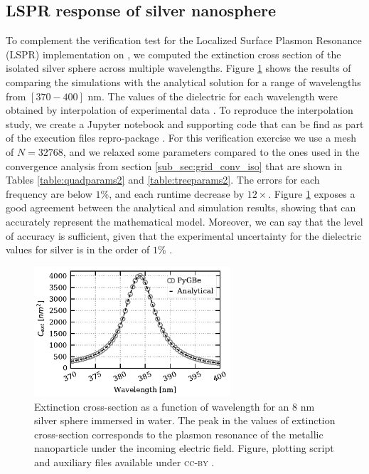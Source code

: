 \subsection{LSPR response of silver nanosphere}\label{sub_sec:lspr_silver_np}

To complement the verification test for the Localized Surface Plasmon Resonance (LSPR) implementation
on \pygbe, we computed the extinction cross section of the isolated silver sphere across multiple 
wavelengths. Figure \ref{fig:verif_sph} shows the results of comparing the simulations with the
analytical solution for a range of wavelengths from $[370-400]$ nm. The values of the dielectric 
for each wavelength were obtained by interpolation of experimental data 
\cite{HaleQuerry1972, JohnsonChristy1972}. To reproduce the interpolation study, we create
a Jupyter notebook and supporting code that can be find as part of the execution files
repro-package \cite{ClementiETal2018b}.
For this verification exercise we use a mesh of $N=32768$, and we relaxed some parameters 
compared to the ones used in the convergence analysis from section \ref{sub_sec:grid_conv_iso} 
that are shown in Tables \ref{table:quadparams2} and \ref{table:treeparams2}. The errors for each 
frequency are below $1\%$, and each runtime decrease by $12\times$.
Figure \ref{fig:verif_sph} exposes a good agreement between the analytical and simulation results, 
showing that \pygbe can accurately represent the mathematical model. Moreover, we can say that 
the level of accuracy is sufficient, given that the experimental uncertainty for the dielectric 
values for silver is in the order of $1\%$ \cite{JohnsonChristy1972}. 

\begin{figure}%
    \centering
    \includegraphics[width=0.65\textwidth]{silver_NP_verification.pdf} 
    \caption{Extinction cross-section as a function of wavelength for an $8$ nm
             silver sphere immersed in water. The peak in the values of 
             extinction cross-section corresponds to the plasmon resonance of the metallic 
             nanoparticle under the incoming electric field. Figure, plotting script and 
             auxiliary files available under \textsc{cc-by} \cite{ClementiETal2018d}.}
    \label{fig:verif_sph}
 \end{figure}

